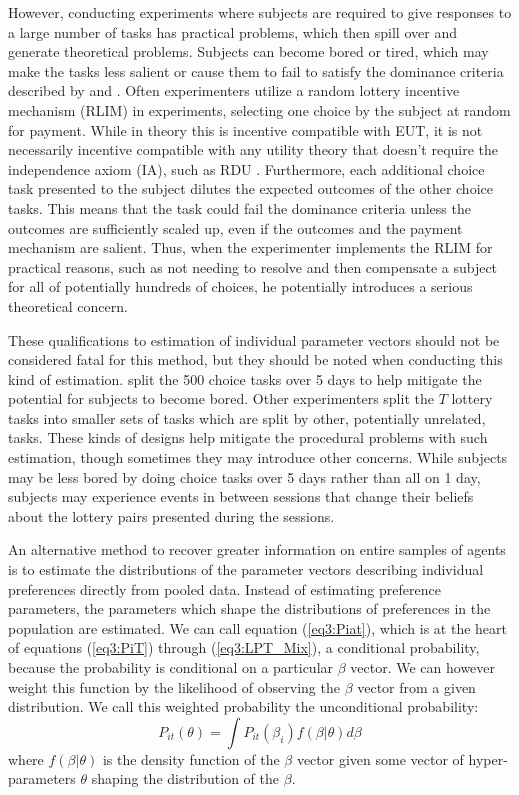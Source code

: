 \documentclass[../main.tex]{subfiles}
\begin{document}
However, conducting experiments where subjects are required to give responses to a large number of tasks has practical problems, which then spill over and generate theoretical problems.
Subjects can become bored or tired, which may make the tasks less salient or cause them to fail to satisfy the dominance criteria described by \textcite{Smith1982} and \textcite{Harrison1992}.
Often experimenters utilize a random lottery incentive mechanism (RLIM) in experiments, selecting one choice by the subject at random for payment.
While in theory this is incentive compatible with EUT, it is not necessarily incentive compatible with any utility theory that doesn't require the independence axiom (IA), such as RDU \parencite{Harrison2014, Cox2015}.
Furthermore, each additional choice task presented to the subject dilutes the expected outcomes of the other choice tasks.
This means that the task could fail the dominance criteria unless the outcomes are sufficiently scaled up, even if the outcomes and the payment mechanism are salient.
Thus, when the experimenter implements the RLIM for practical reasons, such as not needing to resolve and then compensate a subject for all of potentially hundreds of choices, he potentially introduces a serious theoretical concern.

These qualifications to estimation of individual parameter vectors should not be considered fatal for this method, but they should be noted when conducting this kind of estimation.
\textcite{Hey2001} split the 500 choice tasks over 5 days to help mitigate the potential for subjects to become bored.
Other experimenters split the $T$ lottery tasks into smaller sets of tasks which are split by other, potentially unrelated, tasks.
These kinds of designs help mitigate the procedural problems with such estimation, though sometimes they may introduce other concerns.
While subjects may be less bored by doing choice tasks over 5 days rather than all on 1 day, subjects may experience events in between sessions that change their beliefs about the lottery pairs presented during the sessions.

An alternative method to recover greater information on entire samples of agents is to estimate the distributions of the parameter vectors describing individual preferences directly from pooled data.{\footnotemark}
Instead of estimating preference parameters, the parameters which shape the distributions of preferences in the population are estimated.
We can call equation (\ref{eq3:Piat}), which is at the heart of equations (\ref{eq3:PiT}) through (\ref{eq3:LPT_Mix}), a conditional probability, because the probability is conditional on a particular $\beta$ vector.
We can however weight this function by the likelihood of observing the $\beta$ vector from a given distribution.{\footnotemark}
We call this weighted probability the unconditional probability:
\begin{equation}
	\label{eq3:Pit}
	P_{it}(\theta) = \int P_{it}(\beta_i) f(\beta | \theta) d\beta
\end{equation}
\noindent where $f(\beta|\theta)$ is the density function of the $\beta$ vector given some vector of hyper-parameters $\theta$ shaping the distribution of the $\beta$.
\end{document}
